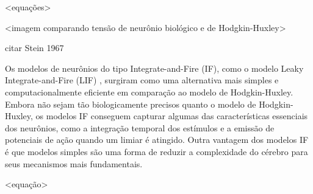 <equações>

<imagem comparando tensão de neurônio biológico e de Hodgkin-Huxley>

citar Stein 1967

Os modelos de neurônios do tipo Integrate-and-Fire (IF), como o modelo Leaky Integrate-and-Fire (LIF) \cite{burkitt2006review},
surgiram como uma alternativa mais simples e computacionalmente eficiente em comparação ao modelo de Hodgkin-Huxley. Embora não
sejam tão biologicamente precisos quanto o modelo de Hodgkin-Huxley, os modelos IF conseguem capturar algumas das características
essenciais dos neurônios, como a integração temporal dos estímulos e a emissão de potenciais de ação quando um limiar é atingido.
Outra vantagem dos modelos IF é que modelos simples são uma forma de reduzir a complexidade do cérebro para seus mecanismos mais
fundamentais.

<equação>